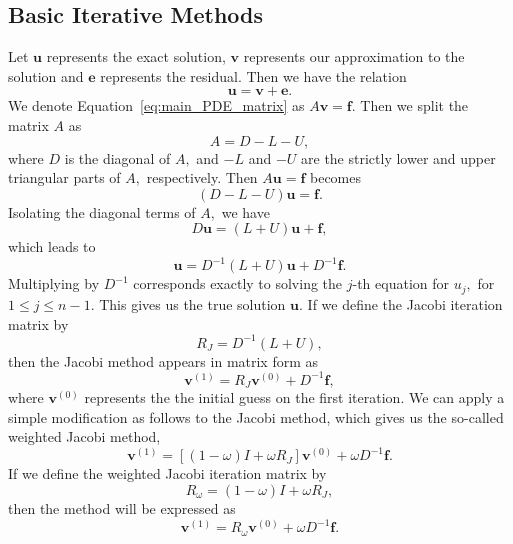 \documentclass[letterpaper,12pt]{article}
\begin{document}
\subsection{Basic Iterative Methods}
Let $\mathbf{u}$ represents the exact solution, $\mathbf{v}$ represents our approximation to the solution and $\mathbf{e}$ represents the residual. Then we have the relation
\begin{equation}
\mathbf{u}=\mathbf{v}+\mathbf{e}.
\end{equation}
We denote Equation~\eqref{eq:main_PDE_matrix} as $A \mathbf{v}=\mathbf{f}$. Then we split the matrix $A$ as
\begin{equation}
A=D-L-U,
\end{equation} 
where $D$ is the diagonal of $A,$ and $-L$ and $-U$ are the strictly lower and upper triangular parts of $A,$ respectively. Then $A \mathbf{u}=\mathbf{f}$ becomes
\begin{equation}
(D-L-U) \mathbf{u}=\mathbf{f}.
\end{equation}
Isolating the diagonal terms of $A,$ we have
\begin{equation}
D \mathbf{u}=(L+U) \mathbf{u}+\mathbf{f},
\end{equation}
which leads to
\begin{equation}
\mathbf{u}=D^{-1}(L+U) \mathbf{u}+D^{-1} \mathbf{f}.
\end{equation}
Multiplying by $D^{-1}$ corresponds exactly to solving the $j$-th equation for $u_{j},$ for $1 \leq j \leq n-1$. This gives us the true solution $\mathbf{u}$. If we define the Jacobi iteration matrix by
\begin{equation}
R_{J}=D^{-1}(L+U),
\end{equation}
then the Jacobi method appears in matrix form as
\begin{equation}
\mathbf{v}^{(1)}=R_{J} \mathbf{v}^{(0)}+D^{-1} \mathbf{f},
\end{equation}
where $\mathbf{v}^{(0)}$ represents the the initial guess on the first iteration. We can apply a simple modification as follows to the Jacobi method, which gives us the so-called weighted Jacobi method,
\begin{equation}
\mathbf{v}^{(1)}=\left[(1-\omega) I+\omega R_{J}\right] \mathbf{v}^{(0)}+\omega D^{-1} \mathbf{f} .
\end{equation}
If we define the weighted Jacobi iteration matrix by
\begin{equation}
R_{\omega}=(1-\omega) I+\omega R_{J},
\end{equation}
then the method will be expressed as 
\begin{equation}
\mathbf{v}^{(1)}=R_{\omega} \mathbf{v}^{(0)}+\omega D^{-1} \mathbf{f}.
\end{equation}
\end{document}
